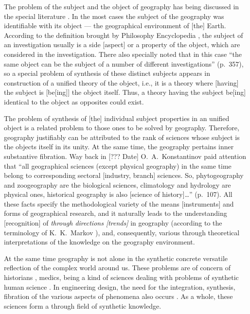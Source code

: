 \documentclass[12pt,leqno]{book}
\begin{document}
The problem of the subject and the object of geography has being discussed in the special literature \cite{b98, b277, b300}. In the most cases the subject of the geography was identifiable with its object --- the geographical environment of [the] Earth. According to the definition brought by Philosophy Encyclopedia \cite{b441}, the subject of an investigation usually is a side [aspect] or a property of the object, which are considered in the investigation. There also specially noted that in this case ``the same object can be the subject of a number of different investigations'' (p.~357), so a special problem of synthesis of these distinct subjects appears in construction of a unified theory of the object, i.e., it is a theory where [having] the subject is [be[ing]] the object itself. Thus, a theory having the subject be[ing] identical to the object as opposites could exist.

The problem of synthesis of [the] individual subject properties in an unified object is a related problem to those ones to be solved by geography. Therefore, geography justifiably can be attributed to the rank of sciences whose subject is the objects itself in its unity. At the same time, the geography pertains inner substantive fibration. Way back in [??? Date] O.~A.~Konstantinov \cite{b207} paid attention that ``all geographical sciences (except physical geography) in the same time belong to corresponding sectoral [industry, branch] sciences. So, phytogeography and zoogeography are the biological sciences, climatology and hydrology are physical ones, historical geography is also [science of history]\ldots{}'' (p.~107). All these facts specify the methodological variety of the means [instruments] and forms of geographical research, and it naturally leads to the understanding [recognition] of \emph{through directions [trends]} in geography (according to the terminology of K.~K.~Markov \cite[p.~47]{b71}), and, consequently, various through theoretical interpretations of the knowledge on the geography environment.

At the same time geography is not alone in the synthetic concrete versatile reflection of the complex world around us. These problems are of concern of historians \cite{b30,b162}, medics\cite{b464}, being a kind of sciences dealing with problems of synthetic human science \cite{b14, b271}. In engineering design, the need for the integration, synthesis, fibration of the various aspects of phenomena also occurs \cite{b326}. As a whole, these sciences form a through field of synthetic knowledge.
\end{document}
